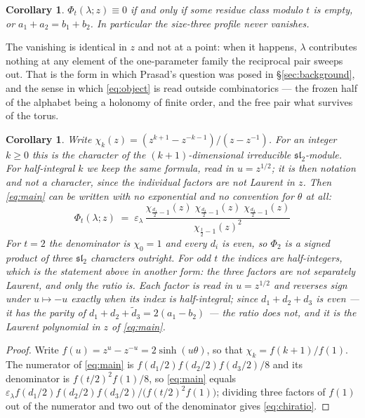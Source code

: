 \documentclass[11pt,reqno]{amsart}
\theoremstyle{plain}
\newtheorem{corollary}[theorem]{Corollary}
\theoremstyle{definition}
\begin{document}
\begin{corollary}\label{cor:zero}
$\Phi_t(\lambda;z)\equiv0$ if and only if some residue class modulo $t$ is empty, or
$a_1+a_2=b_1+b_2$. In particular the size-three profile never vanishes.
\end{corollary}

\noindent The vanishing is identical in $z$ and not at a point: when it happens, $\lambda$
contributes nothing at any element of the one-parameter family the reciprocal pair sweeps out. That
is the form in which Prasad's question was posed in \S\ref{sec:background}, and the sense in which
\eqref{eq:object} is read outside combinatorics --- the frozen half of the alphabet being a
holonomy of finite order, and the free pair what survives of the torus.

\begin{corollary}\label{cor:chars}
Write $\chi_k(z)=(z^{k+1}-z^{-k-1})/(z-z^{-1})$. For an integer $k\ge0$ this is the character of the
$(k+1)$-dimensional irreducible $\mathfrak{sl}_2$-module. For half-integral $k$ we keep the same
formula, read in $u=z^{1/2}$; it is then notation and not a character, since the individual factors
are not Laurent in $z$. Then
\eqref{eq:main} can be written with no exponential and no convention for $\theta$ at all:
\begin{equation}\label{eq:chiratio}
\boxed{\;\;\Phi_t(\lambda;z)\;=\;\varepsilon_\lambda\,
\frac{\chi_{\frac{d_1}{2}-1}(z)\;\chi_{\frac{d_2}{2}-1}(z)\;\chi_{\frac{d_3}{2}-1}(z)}
{\chi_{\frac{t}{2}-1}(z)^{2}}\;\;}
\end{equation}
For $t=2$ the denominator is $\chi_0=1$ and every $d_i$ is even, so $\Phi_2$ is a signed product of
three $\mathfrak{sl}_2$ characters outright. For odd $t$ the indices are half-integers, which is the
statement above in another form: the three factors are not separately Laurent, and only the ratio is.
Each factor is read in $u=z^{1/2}$ and reverses sign under $u\mapsto-u$ exactly when its index is
half-integral; since $d_1+d_2+d_3$ is even --- it has the parity of
$d_1+d_2+\tilde d_3=2(a_1-b_2)$ --- the ratio does not, and it is the Laurent polynomial in $z$ of
\eqref{eq:main}.
\end{corollary}

\begin{proof}
Write $f(u)=z^{u}-z^{-u}=2\sinh(u\theta)$, so that $\chi_k=f(k+1)/f(1)$. The numerator of
\eqref{eq:main} is $f(d_1/2)f(d_2/2)f(d_3/2)/8$ and its denominator is $f(t/2)^2f(1)/8$, so
\eqref{eq:main} equals $\varepsilon_\lambda f(d_1/2)f(d_2/2)f(d_3/2)/\bigl(f(t/2)^2f(1)\bigr)$;
dividing three factors of $f(1)$ out of the numerator and two out of the denominator gives
\eqref{eq:chiratio}.
\end{proof}
\end{document}
